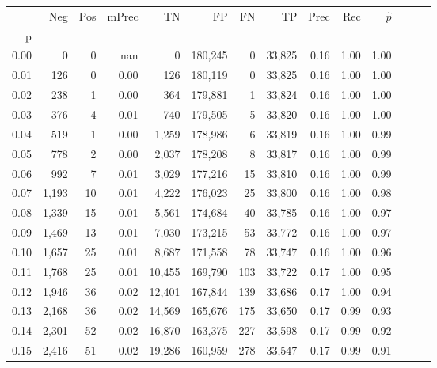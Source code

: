 \begin{tabular}{rrrrrrrrrrrrrr}
\toprule
{} &    Neg &  Pos & mPrec &       TN &       FP &      FN &      TP &  Prec &   Rec & $\hat{p}$ \\
p    &        &      &       &          &          &         &         &       &       &           \\
\midrule
0.00 &      0 &    0 &   nan &        0 &  180,245 &       0 &  33,825 &  0.16 &  1.00 &      1.00 \\
0.01 &    126 &    0 &  0.00 &      126 &  180,119 &       0 &  33,825 &  0.16 &  1.00 &      1.00 \\
0.02 &    238 &    1 &  0.00 &      364 &  179,881 &       1 &  33,824 &  0.16 &  1.00 &      1.00 \\
0.03 &    376 &    4 &  0.01 &      740 &  179,505 &       5 &  33,820 &  0.16 &  1.00 &      1.00 \\
0.04 &    519 &    1 &  0.00 &    1,259 &  178,986 &       6 &  33,819 &  0.16 &  1.00 &      0.99 \\
0.05 &    778 &    2 &  0.00 &    2,037 &  178,208 &       8 &  33,817 &  0.16 &  1.00 &      0.99 \\
0.06 &    992 &    7 &  0.01 &    3,029 &  177,216 &      15 &  33,810 &  0.16 &  1.00 &      0.99 \\
0.07 &  1,193 &   10 &  0.01 &    4,222 &  176,023 &      25 &  33,800 &  0.16 &  1.00 &      0.98 \\
0.08 &  1,339 &   15 &  0.01 &    5,561 &  174,684 &      40 &  33,785 &  0.16 &  1.00 &      0.97 \\
0.09 &  1,469 &   13 &  0.01 &    7,030 &  173,215 &      53 &  33,772 &  0.16 &  1.00 &      0.97 \\
0.10 &  1,657 &   25 &  0.01 &    8,687 &  171,558 &      78 &  33,747 &  0.16 &  1.00 &      0.96 \\
0.11 &  1,768 &   25 &  0.01 &   10,455 &  169,790 &     103 &  33,722 &  0.17 &  1.00 &      0.95 \\
0.12 &  1,946 &   36 &  0.02 &   12,401 &  167,844 &     139 &  33,686 &  0.17 &  1.00 &      0.94 \\
0.13 &  2,168 &   36 &  0.02 &   14,569 &  165,676 &     175 &  33,650 &  0.17 &  0.99 &      0.93 \\
0.14 &  2,301 &   52 &  0.02 &   16,870 &  163,375 &     227 &  33,598 &  0.17 &  0.99 &      0.92 \\
0.15 &  2,416 &   51 &  0.02 &   19,286 &  160,959 &     278 &  33,547 &  0.17 &  0.99 &      0.91 \\

\end{tabular}
